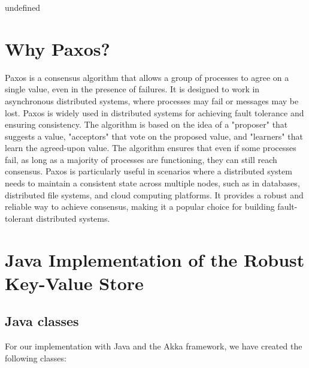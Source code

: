 undefined




\tableofcontents
\listoffigures

\newpage

\section{Why Paxos?}
Paxos is a consensus algorithm that allows a group of processes to agree on a single value, even in the presence of failures. It is designed to work in asynchronous distributed systems, where processes may fail or messages may be lost. Paxos is widely used in distributed systems for achieving fault tolerance and ensuring consistency.
The algorithm is based on the idea of a "proposer" that suggests a value, "acceptors" that vote on the proposed value, and "learners" that learn the agreed-upon value. The algorithm ensures that even if some processes fail, as long as a majority of processes are functioning, they can still reach consensus.
Paxos is particularly useful in scenarios where a distributed system needs to maintain a consistent state across multiple nodes, such as in databases, distributed file systems, and cloud computing platforms. It provides a robust and reliable way to achieve consensus, making it a popular choice for building fault-tolerant distributed systems.

\section{Java Implementation of the Robust Key-Value Store}

\subsection{Java classes}
For our implementation with Java and the Akka framework, we have created the following classes:

